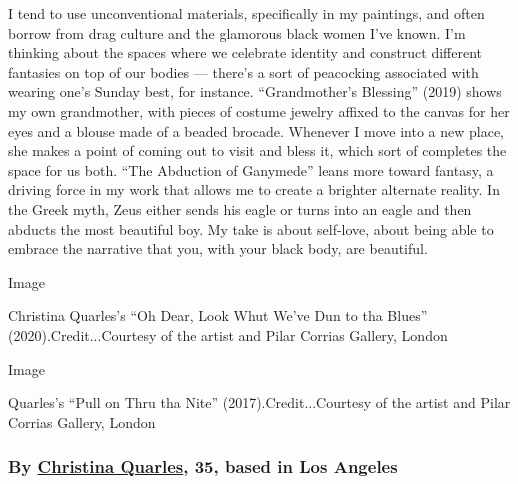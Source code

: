 I tend to use unconventional materials, specifically in my paintings,
and often borrow from drag culture and the glamorous black women I've
known. I'm thinking about the spaces where we celebrate identity and
construct different fantasies on top of our bodies --- there's a sort of
peacocking associated with wearing one's Sunday best, for instance.
``Grandmother's Blessing'' (2019) shows my own grandmother, with pieces
of costume jewelry affixed to the canvas for her eyes and a blouse made
of a beaded brocade. Whenever I move into a new place, she makes a point
of coming out to visit and bless it, which sort of completes the space
for us both. ``The Abduction of Ganymede'' leans more toward fantasy, a
driving force in my work that allows me to create a brighter alternate
reality. In the Greek myth, Zeus either sends his eagle or turns into an
eagle and then abducts the most beautiful boy. My take is about
self-love, about being able to embrace the narrative that you, with your
black body, are beautiful.

Image

Christina Quarles's ``Oh Dear, Look Whut We've Dun to tha Blues''
(2020).Credit...Courtesy of the artist and Pilar Corrias Gallery, London

Image

Quarles's ``Pull on Thru tha Nite'' (2017).Credit...Courtesy of the
artist and Pilar Corrias Gallery, London

\hypertarget{by-christina-quarles-35-based-in-los-angeles}{%
\subsubsection{\texorpdfstring{\textbf{By}
\textbf{\href{https://www.christinaquarles.com/}{Christina Quarles}, 35,
based in Los
Angeles}}{By Christina Quarles, 35, based in Los Angeles}}\label{by-christina-quarles-35-based-in-los-angeles}}

